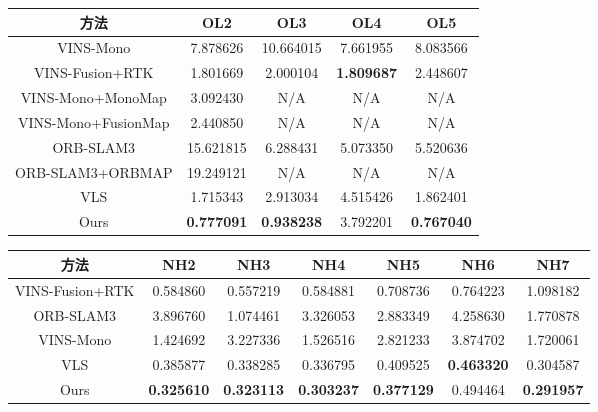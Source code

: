 \begin{table}
\centering
\begin{tabular}{ccccc}
\toprule
\textbf{方法}           & \textbf{OL2}      & \textbf{OL3}      & \textbf{OL4}      & \textbf{OL5}      \\ \midrule
VINS-Mono           & 7.878626          & 10.664015         & 7.661955          & 8.083566          \\
VINS-Fusion+RTK     & 1.801669          & 2.000104          & \cellcolor[HTML]{FA7F6F}\textbf{1.809687}          & 2.448607          \\
VINS-Mono+MonoMap   & 3.092430          & N/A               & N/A               & N/A               \\
VINS-Mono+FusionMap & 2.440850          & N/A               & N/A               & N/A               \\
ORB-SLAM3           & 15.621815         & 6.288431          & 5.073350          & 5.520636          \\
ORB-SLAM3+ORBMAP    & 19.249121         & N/A               & N/A               & N/A               \\
VLS                 & 1.715343          & 2.913034          & 4.515426          & 1.862401          \\
Ours                & \cellcolor[HTML]{FA7F6F}\textbf{0.777091} & \cellcolor[HTML]{FA7F6F}\textbf{0.938238} & 3.792201 & \cellcolor[HTML]{FA7F6F}\textbf{0.767040} \\ \bottomrule
\end{tabular}
\end{table}

\begin{table}
\centering
\begin{tabular}{ccccccc}
\toprule
\textbf{方法}       & \textbf{NH2}      & \textbf{NH3}      & \textbf{NH4}      & \textbf{NH5}      & \textbf{NH6}      & \textbf{NH7}      \\ \midrule
VINS-Fusion+RTK & 0.584860          & 0.557219          & 0.584881          & 0.708736          & 0.764223          & 1.098182          \\
ORB-SLAM3       & 3.896760          & 1.074461          & 3.326053          & 2.883349          & 4.258630          & 1.770878          \\
VINS-Mono       & 1.424692          & 3.227336          & 1.526516          & 2.821233          & 3.874702          & 1.720061          \\
VLS             & 0.385877          & 0.338285          & 0.336795          & 0.409525          & \cellcolor[HTML]{FA7F6F}\textbf{0.463320} & 0.304587          \\
Ours            & \cellcolor[HTML]{FA7F6F}\textbf{0.325610} & \cellcolor[HTML]{FA7F6F}\textbf{0.323113} & \cellcolor[HTML]{FA7F6F}\textbf{0.303237} & \cellcolor[HTML]{FA7F6F}\textbf{0.377129} & 0.494464          & \cellcolor[HTML]{FA7F6F}\textbf{0.291957} \\ \bottomrule
\end{tabular}
\end{table}
